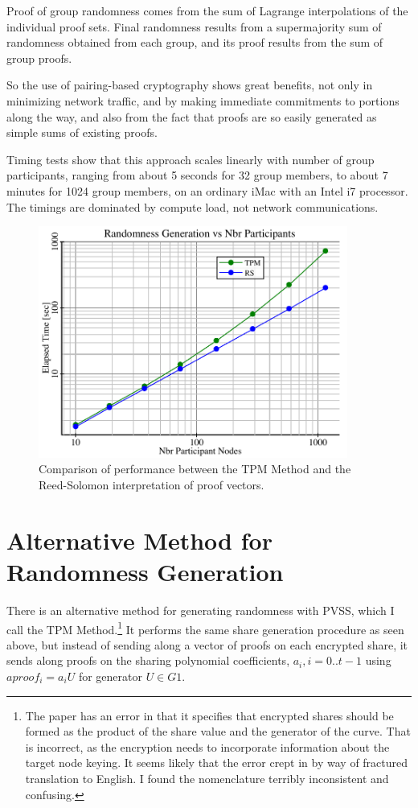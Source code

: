 \documentclass[article,oneside]{memoir}
\begin{document}
Proof of group randomness comes from the sum of Lagrange interpolations of the individual proof sets.
Final randomness results from a supermajority sum of randomness obtained from each group, and its proof results from the sum of group proofs. 

So the use of pairing-based cryptography shows great benefits, not only in minimizing network traffic, and by making immediate commitments to portions along the way, and also from the fact that proofs are so easily generated as simple sums of existing proofs.

Timing tests show that this approach scales linearly with number of group participants, ranging from about 5 seconds for 32 group members, to about 7 minutes for 1024 group members, on an ordinary iMac with an Intel i7 processor. The timings are dominated by compute load, not network communications.

\begin{figure}[h!]
  \centering
  \includegraphics[width=4in]{randtimings}
  \caption{ Comparison of performance between the TPM Method and the Reed-Solomon interpretation of proof vectors.}
  \label{fig:randtimings}
\end{figure}

\chapter{Alternative Method for Randomness Generation}
There is an alternative method for generating randomness with PVSS, which I call the TPM Method.\cite{tpm}\footnote{The paper has an error in that it specifies that encrypted shares should be formed as the product of the share value and the generator of the curve. That is incorrect, as the encryption needs to incorporate information about the target node keying. It seems likely that the error crept in by way of fractured translation to English. I found the nomenclature terribly inconsistent and confusing.} It performs the same share generation procedure as seen above, but instead of sending along a vector of proofs on each encrypted share, it sends along proofs on the sharing polynomial coefficients, $a_i, i = 0..t-1$ using $aproof_i = a_i U$ for generator $U \in G1$.
\end{document}
